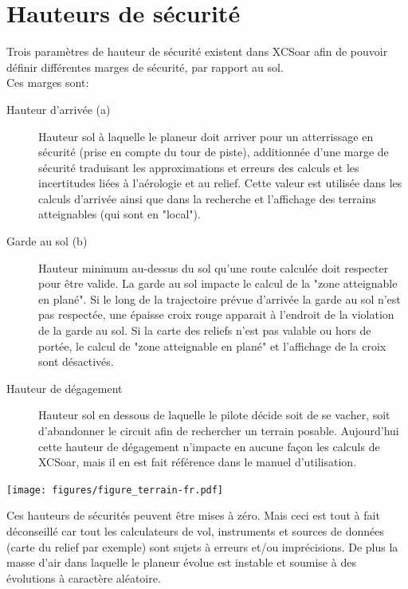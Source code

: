 \section{Hauteurs de sécurité}\label{sec:safety-heights}
Trois paramètres de hauteur de sécurité existent dans XCSoar afin de pouvoir définir différentes marges de sécurité, par rapport au sol.
\\
Ces marges sont:
\begin{description}
\item[Hauteur d'arrivée (a)]  Hauteur sol à laquelle le planeur doit arriver pour un atterrissage en sécurité (prise en compte du tour de piste), additionnée d'une marge de sécurité traduisant les  approximations et erreurs des calculs et les incertitudes liées à l'aérologie et au relief. Cette valeur est utilisée dans les calculs d'arrivée ainsi que dans la recherche et l'affichage des terrains atteignables (qui sont en "local").
\item[Garde au sol (b)] Hauteur minimum au-dessus du sol qu'une route calculée doit respecter pour être valide. La garde au sol impacte le calcul de la "zone atteignable en plané". Si le long de la trajectoire prévue d'arrivée la garde au sol n'est pas respectée, une épaisse croix rouge apparait à l'endroit de la violation de la garde au sol. Si la carte des reliefs n'est pas valable ou hors de portée, le calcul de "zone atteignable en plané" et l'affichage de la croix sont désactivés. 
\item[Hauteur de dégagement]  Hauteur sol en dessous de laquelle le pilote décide soit de se vacher, soit d'abandonner le circuit afin de rechercher un terrain posable. Aujourd'hui cette hauteur de dégagement n'impacte en aucune façon les calculs de XCSoar, mais il en est fait référence dans le manuel d'utilisation.
\end{description}

\begin{center}
\texttt{[image: figures/figure\_terrain-fr.pdf]}
\end{center}

\warning
Ces hauteurs de sécurités peuvent être mises à zéro. Mais ceci est tout à fait déconseillé car tout les calculateurs de vol, instruments et sources de données (carte du relief par exemple) sont sujets à erreurs et/ou imprécisions. De plus la masse d'air dans laquelle le planeur évolue est instable et soumise à des évolutions à caractère aléatoire.

